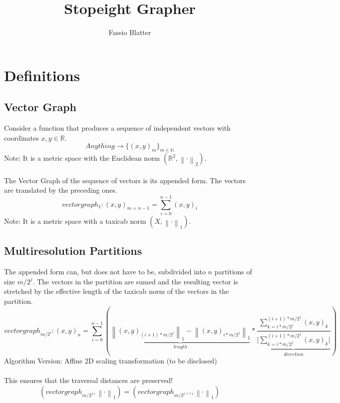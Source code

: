 \documentclass{report}
\newcommand\norm[1]{\left\lVert#1\right\rVert}
\begin{document}
\title{Stopeight Grapher}
\author{Fassio Blatter}
\maketitle

\chapter{Definitions}
\section{Vector Graph}
Consider a function that produces a sequence of independent vectors with coordinates $x,y \in \mathbb{R}$.
\begin{equation}
Anything \rightarrow \{(x,y)_{m}\}_{m \in \mathbb{N}}
\end{equation}
Note: It is a metric space with the Euclidean norm $(\mathbb{R}^2,\norm{\cdot}_2)$.\\\\
The Vector Graph of the sequence of vectors is its appended form. The vectors are translated by the preceding ones.\\
\begin{equation}
vectorgraph_{1}: (x,y)_{m=n-1}=\sum_{i=0}^{n-1} (x,y)_{i}
\end{equation}
Note: It is a metric space with a taxicab norm $(X,\norm{\cdot}_1)$.
\section{Multiresolution Partitions}
The appended form can, but does not have to be, subdivided into $n$ partitions of size $m/2^j$. The vectors in the partition are sumed and the resulting vector is stretched by the effective length of the taxicab norm of the vectors in the partition.
\begin{equation}
vectorgraph_{m/2^{j}}:(x,y)_{n}=\sum_{i=0}^{n-1} (\underbrace{\norm{(x,y)_{(i+1)*m/2^j}}_{1} - \norm{(x,y)_{i*m/2^j}}_{1}}_{length} * \underbrace{\frac{\sum_{k=i*m/2^j}^{(i+1)*m/2^j} (x,y)_{k}}{\vert \sum_{k=i*m/2^j}^{(i+1)*m/2^{j}} (x,y)_{k} \vert}}_{direction})
\end{equation}
Algorithm Version: Affine 2D scaling transformation (to be disclosed)\\\\
This ensures that the traversal distances are preserved!
\begin{equation}
(vectorgraph_{m/2^j},\norm{\cdot}_{1})=(vectorgraph_{m/2^{j+1}},\norm{\cdot}_{1})
\end{equation}
\end{document}
